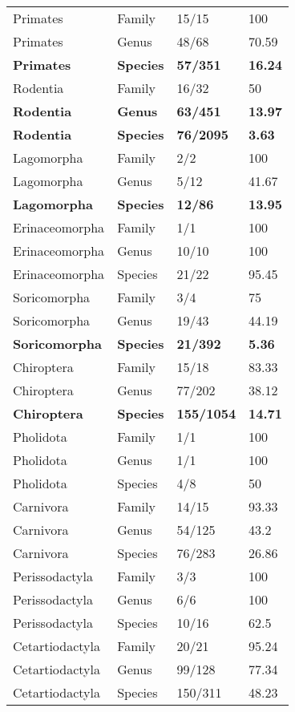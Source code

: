 \begin{longtable}{llll}
  Primates & Family & 15/15 & 100 \\ 
  Primates & Genus & 48/68 & 70.59 \\ 
  \textbf{Primates} & \textbf{Species} & \textbf{57/351} & \textbf{16.24} \\ 
  Rodentia & Family & 16/32 & 50 \\ 
  \textbf{Rodentia} & \textbf{Genus} & \textbf{63/451} & \textbf{13.97} \\ 
  \textbf{Rodentia} & \textbf{Species} & \textbf{76/2095} & \textbf{3.63} \\ 
  Lagomorpha & Family & 2/2 & 100 \\ 
  Lagomorpha & Genus & 5/12 & 41.67 \\ 
  \textbf{Lagomorpha} & \textbf{Species} & \textbf{12/86} & \textbf{13.95} \\ 
  Erinaceomorpha & Family & 1/1 & 100 \\ 
  Erinaceomorpha & Genus & 10/10 & 100 \\ 
  Erinaceomorpha & Species & 21/22 & 95.45 \\ 
  Soricomorpha & Family & 3/4 & 75 \\ 
  Soricomorpha & Genus & 19/43 & 44.19 \\ 
  \textbf{Soricomorpha} & \textbf{Species} & \textbf{21/392} & \textbf{5.36} \\ 
  Chiroptera & Family & 15/18 & 83.33 \\ 
  Chiroptera & Genus & 77/202 & 38.12 \\ 
  \textbf{Chiroptera} & \textbf{Species} & \textbf{155/1054} & \textbf{14.71} \\ 
  Pholidota & Family & 1/1 & 100 \\ 
  Pholidota & Genus & 1/1 & 100 \\ 
  Pholidota & Species & 4/8 & 50 \\ 
  Carnivora & Family & 14/15 & 93.33 \\ 
  Carnivora & Genus & 54/125 & 43.2 \\ 
  Carnivora & Species & 76/283 & 26.86 \\ 
  Perissodactyla & Family & 3/3 & 100 \\ 
  Perissodactyla & Genus & 6/6 & 100 \\ 
  Perissodactyla & Species & 10/16 & 62.5 \\ 
  Cetartiodactyla & Family & 20/21 & 95.24 \\ 
  Cetartiodactyla & Genus & 99/128 & 77.34 \\ 
  Cetartiodactyla & Species & 150/311 & 48.23 \\ 
   \hline
\hline
\end{longtable}
